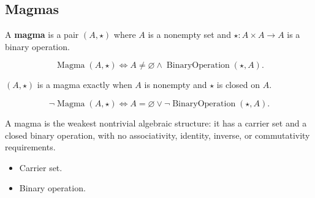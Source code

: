 \subsection{Magmas}
\label{subsec:magmas}

\begin{tcolorbox}[title={Definition --- Magma}]
\begin{definition}[Magma]
\label{def:magma}
A \textbf{magma} is a pair $(A,\star)$ where $A$ is a nonempty set and
$\star:A\times A\to A$ is a binary operation.
\end{definition}
\end{tcolorbox}

\begin{remark*}
\[
\operatorname{Magma}(A,\star)
\Longleftrightarrow
A\neq\varnothing
\land
\operatorname{BinaryOperation}(\star,A).
\]
\end{remark*}

\begin{remark*}
$(A,\star)$ is a magma exactly when $A$ is nonempty and $\star$ is closed on
$A$.
\end{remark*}

\begin{remark*}
\[
\neg\operatorname{Magma}(A,\star)
\Longleftrightarrow
A=\varnothing
\lor
\neg\operatorname{BinaryOperation}(\star,A).
\]
\end{remark*}

\begin{remark*}[Interpretation]
A magma is the weakest nontrivial algebraic structure: it has a carrier set and
a closed binary operation, with no associativity, identity, inverse, or
commutativity requirements.
\end{remark*}

\begin{remark*}[Dependencies]
\begin{itemize}
  \item Carrier set.
  \item Binary operation.
\end{itemize}
\end{remark*}
